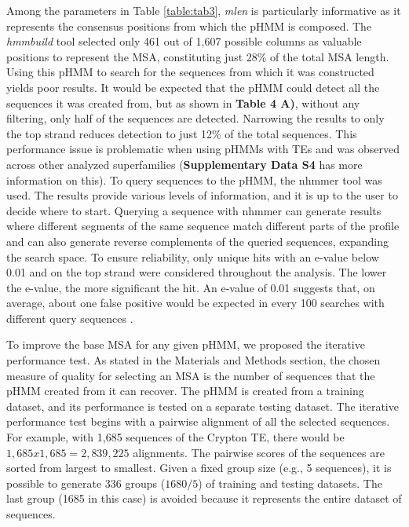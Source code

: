 \documentclass[unnumsec,webpdf,contemporary,large]{oup-authoring-template}%
\theoremstyle{thmstyleone}%
\theoremstyle{thmstyletwo}%
\theoremstyle{thmstylethree}%
\begin{document}
Among the parameters in Table \ref{table:tab3}, \textit{mlen} is particularly informative as it represents the consensus positions from which the pHMM is composed. The \textit{hmmbuild} tool selected only 461 out of 1,607 possible columns as valuable positions to represent the MSA, constituting just 28\% of the total MSA length. Using this pHMM to search for the sequences from which it was constructed yields poor results. It would be expected that the pHMM could detect all the sequences it was created from, but as shown in \textbf{Table 4 A)}, without any filtering, only half of the sequences are detected. Narrowing the results to only the top strand reduces detection to just 12\% of the total sequences. This performance issue is problematic when using pHMMs with TEs and was observed across other analyzed superfamilies (\textbf{Supplementary Data S4} has more information on this).
To query sequences to the pHMM, the nhmmer tool was used. The results provide various levels of information, and it is up to the user to decide where to start. Querying a sequence with nhmmer can generate results where different segments of the same sequence match different parts of the profile and can also generate reverse complements of the queried sequences, expanding the search space. To ensure reliability, only unique hits with an e-value below 0.01 and on the top strand were considered throughout the analysis. The lower the e-value, the more significant the hit. An e-value of 0.01 suggests that, on average, about one false positive would be expected in every 100 searches with different query sequences \cite{sean_r_eddy_hmmer_2023}. 

To improve the base MSA for any given pHMM, we proposed the iterative performance test. As stated in the Materials and Methods section, the chosen measure of quality for selecting an MSA is the number of sequences that the pHMM created from it can recover. The pHMM is created from a training dataset, and its performance is tested on a separate testing dataset. The iterative performance test begins with a pairwise alignment of all the selected sequences. For example, with 1,685 sequences of the Crypton TE, there would be $1,685 x 1,685 = 2,839,225$ alignments. The pairwise scores of the sequences are sorted from largest to smallest. Given a fixed group size (e.g., 5 sequences), it is possible to generate 336 groups ($1680/5$) of training and testing datasets. The last group (1685 in this case) is avoided because it represents the entire dataset of sequences.
\end{document}

